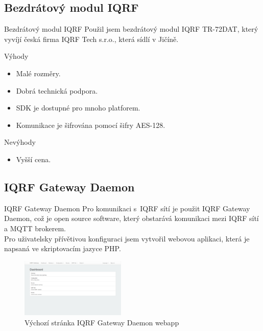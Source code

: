 \documentclass[11pt]{beamer}
\begin{document}
\subsection{Bezdrátový modul IQRF}

\begin{frame}{Bezdrátový modul IQRF}
  Použil jsem bezdrátový modul IQRF TR-72DAT, který vyvíjí česká firma IQRF Tech s.r.o., která sídlí v Jičíně.
  \begin{exampleblock}{Výhody}
    \begin{itemize}
      \item Malé rozměry.
      \item Dobrá technická podpora.
      \item SDK je dostupné pro mnoho platforem.
      \item Komunikace je šifrována pomocí šifry AES-128.
    \end{itemize}
  \end{exampleblock}
  \begin{alertblock}{Nevýhody}
    \begin{itemize}
      \item Vyšší cena.
    \end{itemize}
  \end{alertblock}
\end{frame}

\subsection{IQRF Gateway Daemon}

\begin{frame}{IQRF Gateway Daemon}
  Pro komunikaci s~IQRF sítí je použit IQRF Gateway Daemon, což je open source software, který obstarává komunikaci mezi IQRF sítí a MQTT brokerem. \\[4mm]
  Pro uživatelsky přívětivou konfiguraci jsem vytvořil webovou aplikaci, která je napsaná ve skriptovacím jazyce PHP.
  \begin{figure}
    \includegraphics[width = 50mm]{../img/iqrf/iqrf-daemon-webapp.png}
    \caption{Výchozí stránka IQRF Gateway Daemon webapp}
  \end{figure}
\end{frame}
\end{document}
